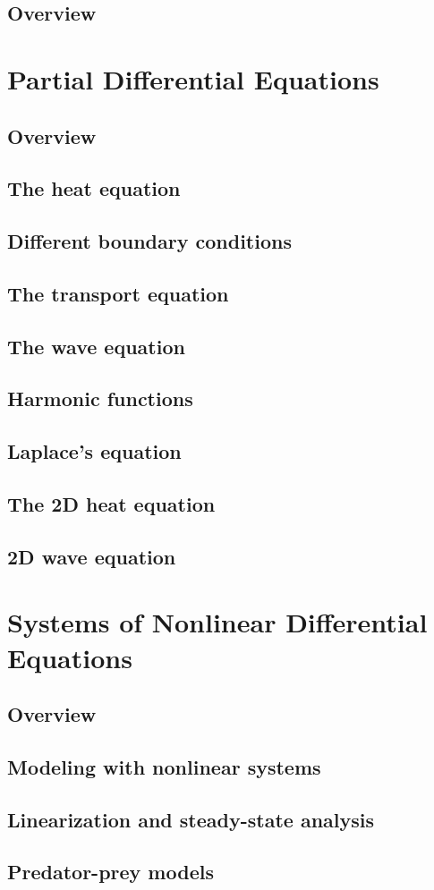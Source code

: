 \documentclass{article}
\begin{document}
\subsection*{Overview}


\pagebreak
\section{Partial Differential Equations}
\subsection*{Overview}

\subsection{The heat equation}
\subsection{Different boundary conditions}
\subsection{The transport equation}
\subsection{The wave equation}
\subsection{Harmonic functions}
\subsection{Laplace's equation}
\subsection{The 2D heat equation}
\subsection{2D wave equation}

\pagebreak

\section{Systems of Nonlinear Differential Equations}

\subsection*{Overview}

\subsection{Modeling with nonlinear systems}
\subsection{Linearization and steady-state analysis}
\subsection{Predator-prey models}


\pagebreak
\end{document}
